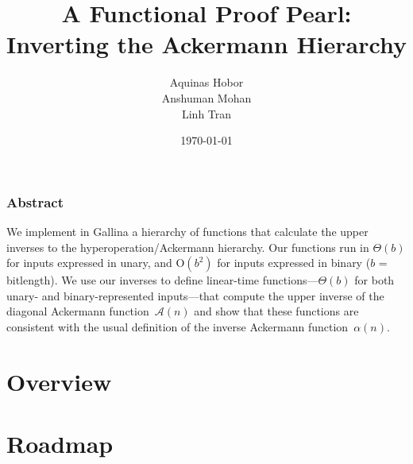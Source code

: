 \documentclass[10pt]{beamer}
\title[Inverting the Ackermann Hierarchy]{A Functional Proof Pearl: \protect\\ Inverting the Ackermann Hierarchy} %
\author{Aquinas Hobor\\
Anshuman Mohan\\
Linh Tran
} %
\institute[NUS] %
{
National University of Singapore %
}
\date{\today} %
\newcommand{\bigO}{\text{O}}
\newcommand{\Ack}{\ensuremath{\mathcal{A}}}
\begin{document}
\begin{frame}
\titlepage %
\end{frame}

\begin{frame}
\frametitle{Abstract}
We implement in Gallina a hierarchy of functions that calculate
the upper inverses to the hyperoperation/Ackermann hierarchy.
Our functions run in $\Theta(b)$ for inputs expressed
in unary, and $\bigO(b^2)$ for inputs expressed in binary ($b$ = bitlength).
We use our inverses to define linear-time functions---$\Theta(b)$ for both unary- 
and binary-represented inputs---that compute the upper inverse of the 
diagonal Ackermann %
function~$\Ack(n)$ and show that these functions are consistent with the usual definition of the inverse Ackermann function~$\alpha(n)$.
\end{frame}


\section*{Overview}
\label{sec: overview}


\section*{Roadmap}
\end{document}
